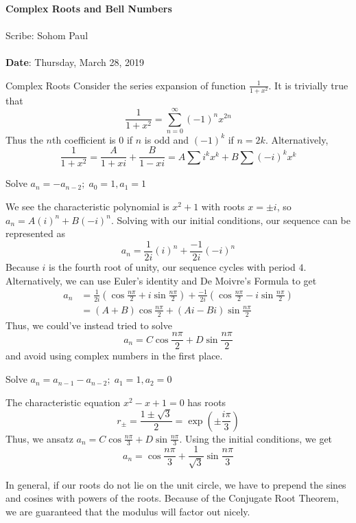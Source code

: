 \documentclass[11pt,twosided]{article}
\def\titlestring{Complex Roots and Bell Numbers}
\def\scribestring{Sohom Paul}
\def\datestring{Thursday, March 28, 2019}
\begin{document}
\thispagestyle{plain}  %

\noindent
{\LARGE \textbf{\titlestring}}\\\\
%
{\Large Scribe: \scribestring}\\ \\
{\textbf{Date}: \datestring} 
\begin{section}{Complex Roots}
Consider the series expansion of function $\frac{1}{1+x^2}$. It is trivially true that 
$$\frac{1}{1+x^2} = \sum_{n=0}^\infty (-1)^n x^{2n}$$
Thus the $n$th coefficient is 0 if $n$ is odd and $(-1)^k$ if $n=2k$. Alternatively,
$$\frac{1}{1+x^2} = \frac{A}{1+xi} + \frac{B}{1-xi} = A\sum i^kx^k + B \sum (-i)^k x^k$$
\begin{problem}{1}
Solve $a_n = -a_{n-2}; \; a_0 = 1, a_1 = 1$
\end{problem}
\begin{solution}
We see the characteristic polynomial is $x^2 +1$ with roots $x=\pm i$, so $a_n = A(i)^n + B(-i)^n$. Solving with our initial conditions, our sequence can be represented as
$$a_n = \frac{1}{2i}(i)^n + \frac{-1}{2i}(-i)^n$$
Because $i$ is the fourth root of unity, our sequence cycles with period $4$. 
Alternatively, we can use Euler's identity and De Moivre's Formula to get
\begin{align*}
    a_n &= \frac{1}{2i}\left(\cos \frac{n\pi}{2} + i \sin\frac{n\pi}{2}\right) + \frac{-1}{2i}\left(\cos \frac{n\pi}{2} - i \sin\frac{n\pi}{2}\right) \\
    &= (A+B) \cos \frac{n\pi}{2} + (Ai-Bi)\sin \frac{n\pi}{2}
\end{align*}
Thus, we could've instead tried to solve 
$$a_n = C \cos \frac{n\pi}{2} + D \sin \frac{n\pi}{2}$$
and avoid using complex numbers in the first place.
\end{solution}
\begin{problem}{2}
Solve $a_n = a_{n-1} - a_{n-2}; \; a_1 = 1, a_2 = 0$
\end{problem}
\begin{solution}
    The characteristic equation $x^2 - x + 1 = 0$ has roots $$r_\pm = \frac{1 \pm \sqrt{3}}{2} = \exp\left(\pm\frac{i\pi}{3}\right)$$
    Thus, we ansatz $a_n = C \cos \frac{n\pi}{3} + D \sin \frac{n\pi}{3}$. Using the initial conditions, we get
    $$a_n = \cos \frac{n\pi}{3} + \frac{1}{\sqrt{3}} \sin \frac{n\pi}{3}$$
\end{solution}
In general, if our roots do not lie on the unit circle, we have to prepend the sines and cosines with powers of the roots. Because of the Conjugate Root Theorem, we are guaranteed that the modulus will factor out nicely.
\end{section}
\end{document}
